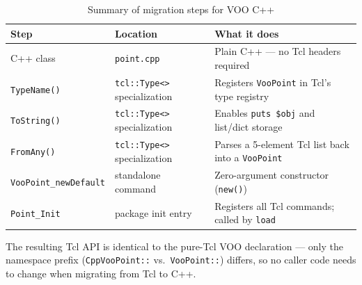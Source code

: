 \begin{table}[H]
\centering
\caption{Summary of migration steps for VOO C++}
\begin{tabular}{L{4.0cm}L{2.5cm}L{6.5cm}}
\toprule
\textbf{Step} & \textbf{Location} & \textbf{What it does} \\
\midrule
C++ class  & \texttt{point.cpp} & Plain C++ --- no Tcl headers required \\
\texttt{TypeName()} & \texttt{tcl::Type<>} specialization & Registers \texttt{VooPoint} in Tcl's type registry \\
\texttt{ToString()} & \texttt{tcl::Type<>} specialization & Enables \texttt{puts \$obj} and list/dict storage \\
\texttt{FromAny()}  & \texttt{tcl::Type<>} specialization & Parses a 5-element Tcl list back into a \texttt{VooPoint} \\
\texttt{VooPoint\_newDefault} & standalone command & Zero-argument constructor (\texttt{new()}) \\
\texttt{Point\_Init} & package init entry & Registers all Tcl commands; called by \texttt{load} \\
\bottomrule
\end{tabular}
\end{table}

The resulting Tcl API is identical to the pure-Tcl VOO declaration --- only the namespace
prefix (\texttt{CppVooPoint::} vs.\ \texttt{VooPoint::}) differs, so no caller code
needs to change when migrating from Tcl to C++.
